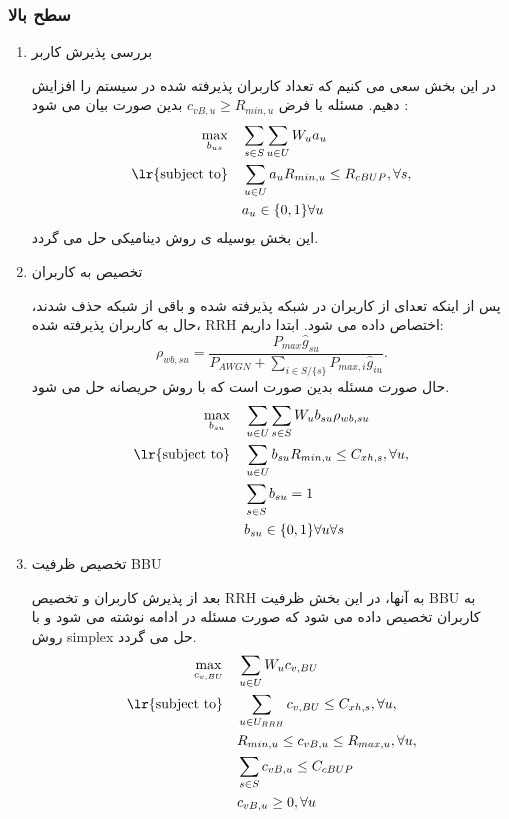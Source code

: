\subsubsection{سطح بالا}
 \begin{enumerate}
 \item بررسی پذیرش کاربر
 
 در این بخش سعی می کنیم که تعداد کاربران پذیرفته شده در سیستم را افزایش دهیم.
 مسئله با فرض
  $c_{vB,u} \geq R_{min,u} $
   بدین صورت بیان می شود
  :
 \begin{equation}
 \begin{aligned}
 \max\limits_{b_{us}}   \quad &  \sum_{s\in S}\sum_{u\in U} W_{u} a_u  \\
\text{\lr{subject to}} \quad  & \sum_{u\in U} a_{u} R_{min,u}  \leq R_{cBUP} , \forall s,   \\
&  a_u \in \{0,1\}  \forall u   \\ 
 \end{aligned}	
 \end{equation}
 این بخش بوسیله ی روش دینامیکی حل می گردد.
 \item تخصیص به کاربران
 
 پس از اینکه تعدای از کاربران در شبکه پذیرفته شده و باقی از شبکه حذف شدند، حال به کاربران پذیرفته شده، RRH اختصاص داده می شود.
 ابتدا داریم:
  \begin{equation}
 \rho_{wb,su} = \frac{P_{max}\hat{g}_{su}}{P_{AWGN}+\sum_{i\in S/\{s\}}P_{max,i}\hat{g}_{iu}}.
 \end{equation}
 حال صورت مسئله بدین صورت است که با روش حریصانه حل می شود.
  \begin{equation}
 \begin{aligned}
 \max\limits_{b_{su}}   \quad &  \sum_{u\in U}\sum_{s\in S} W_{u} {b_{su}} \rho_{wb,su} \\
\text{\lr{subject to}} \quad  & \sum_{u\in U} b_{su} R_{min,u}  \leq C_{xh,s} , \forall u,   \\
& \sum_{s \in S}  b_{su} = 1 \\ 
&  {b_{su}} \in \{0,1\}  \forall u  \forall s  \\ 
 \end{aligned}	
 \end{equation}
 \item تخصیص ظرفیت BBU
 
بعد از پذیرش کاربران و تخصیص RRH به آنها، در این بخش ظرفیت BBU به کاربران تخصیص داده می شود که صورت مسئله در ادامه نوشته می شود و با روش simplex حل می گردد.
   \begin{equation}
 \begin{aligned}
 \max\limits_{c_{v,BU}}   \quad &  \sum_{u\in U} W_{u} {c_{v,BU}} \\
\text{\lr{subject to}} \quad  & \sum_{u\in U_{RRH}}c_{v,BU}  \leq C_{xh,s} , \forall u,   \\
&  R_{min,u} \leq  c_{vB,u} \leq  R_{max,u} , \forall u,   \\
& \sum_{s \in S}  c_{vB,u} \leq C_{cBUP} \\ 
&  c_{vB,u} \geq 0 , \forall u   \\
 \end{aligned}	
 \end{equation}
 \end{enumerate}
